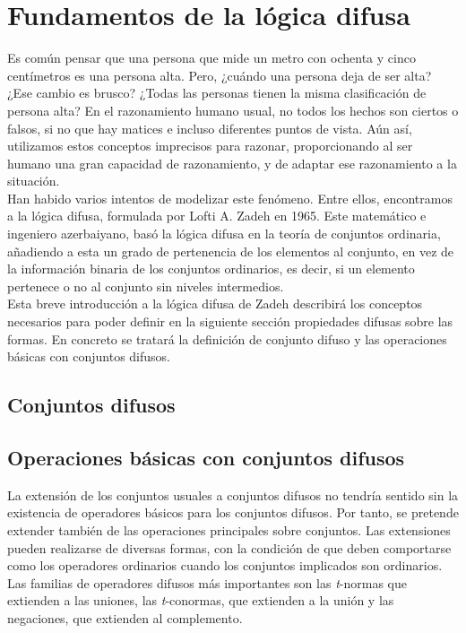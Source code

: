 \section{Fundamentos de la lógica difusa}

Es común pensar que una persona que mide un metro con ochenta y cinco centímetros es una persona alta. Pero, ¿cuándo una persona deja de ser alta? ¿Ese cambio es brusco? ¿Todas las personas tienen la misma clasificación de persona alta? En el razonamiento humano usual, no todos los hechos son ciertos o falsos, si no que hay matices e incluso diferentes puntos de vista. Aún así, utilizamos estos conceptos imprecisos para razonar, proporcionando al ser humano una gran capacidad de razonamiento, y de adaptar ese razonamiento a la situación.\\

Han habido varios intentos de modelizar este fenómeno. Entre ellos, encontramos a la lógica difusa, formulada por Lofti A. Zadeh en 1965. Este matemático e ingeniero azerbaiyano, basó la lógica difusa en la teoría de conjuntos ordinaria, añadiendo a esta un grado de pertenencia de los elementos al conjunto, en vez de la información binaria de los conjuntos ordinarios, es decir, si un elemento pertenece o no al conjunto sin niveles intermedios.\\

Esta breve introducción a la lógica difusa de Zadeh describirá los conceptos necesarios para poder definir en la siguiente sección propiedades difusas sobre las formas. En concreto se tratará la definición de conjunto difuso y las operaciones básicas con conjuntos difusos.\\

\subsection{Conjuntos difusos}

\subsection{Operaciones básicas con conjuntos difusos}

La extensión de los conjuntos usuales a conjuntos difusos no tendría sentido sin la existencia de operadores básicos para los conjuntos difusos. Por tanto, se pretende extender también de las operaciones principales sobre conjuntos. Las extensiones pueden realizarse de diversas formas, con la condición de que deben comportarse como los operadores ordinarios cuando los conjuntos implicados son ordinarios. Las familias de operadores difusos más importantes son las \textit{t}-normas que extienden a las uniones, las \textit{t}-conormas, que extienden a la unión y las negaciones, que extienden al complemento.\\

